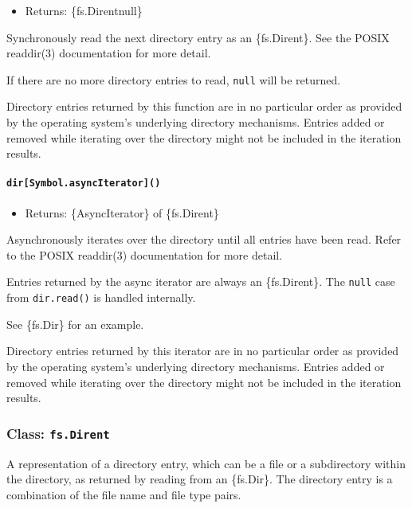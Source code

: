 \begin{itemize}
\tightlist
\item
  Returns: \{fs.Dirent\textbar null\}
\end{itemize}

Synchronously read the next directory entry as an \{fs.Dirent\}. See the
POSIX readdir(3) documentation for more detail.

If there are no more directory entries to read, \texttt{null} will be
returned.

Directory entries returned by this function are in no particular order
as provided by the operating system's underlying directory mechanisms.
Entries added or removed while iterating over the directory might not be
included in the iteration results.

\paragraph{\texorpdfstring{\texttt{dir{[}Symbol.asyncIterator{]}()}}{dir{[}Symbol.asyncIterator{]}()}}\label{dirsymbol.asynciterator}

\begin{itemize}
\tightlist
\item
  Returns: \{AsyncIterator\} of \{fs.Dirent\}
\end{itemize}

Asynchronously iterates over the directory until all entries have been
read. Refer to the POSIX readdir(3) documentation for more detail.

Entries returned by the async iterator are always an \{fs.Dirent\}. The
\texttt{null} case from \texttt{dir.read()} is handled internally.

See \{fs.Dir\} for an example.

Directory entries returned by this iterator are in no particular order
as provided by the operating system's underlying directory mechanisms.
Entries added or removed while iterating over the directory might not be
included in the iteration results.

\subsubsection{\texorpdfstring{Class:
\texttt{fs.Dirent}}{Class: fs.Dirent}}\label{class-fs.dirent}

A representation of a directory entry, which can be a file or a
subdirectory within the directory, as returned by reading from an
\{fs.Dir\}. The directory entry is a combination of the file name and
file type pairs.

